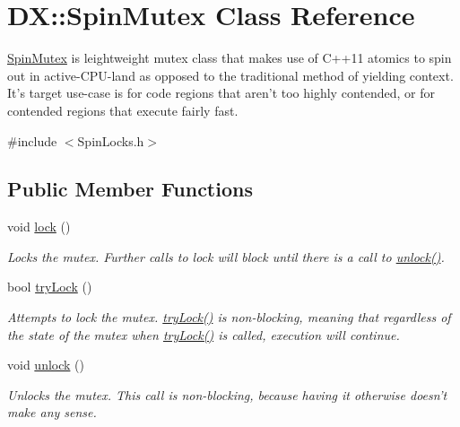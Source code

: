 \hypertarget{class_d_x_1_1_spin_mutex}{\section{D\-X\-:\-:Spin\-Mutex Class Reference}
\label{class_d_x_1_1_spin_mutex}
}


\hyperlink{class_d_x_1_1_spin_mutex}{Spin\-Mutex} is leightweight mutex class that makes use of C++11 atomics to spin out in active-\/\-C\-P\-U-\/land as opposed to the traditional method of yielding context. It's target use-\/case is for code regions that aren't too highly contended, or for contended regions that execute fairly fast.  




{\ttfamily \#include $<$Spin\-Locks.\-h$>$}

\subsection*{Public Member Functions}
\begin{DoxyCompactItemize}
\item 
void \hyperlink{class_d_x_1_1_spin_mutex_ad550ac8a2a96dbc0e53bb52c58c4a2e9}{lock} ()
\begin{DoxyCompactList}\small\item\em Locks the mutex. Further calls to lock will block until there is a call to \hyperlink{class_d_x_1_1_spin_mutex_a5c4d4863862540c18c007501d87168d6}{unlock()}. \end{DoxyCompactList}\item 
bool \hyperlink{class_d_x_1_1_spin_mutex_a5c1345257b4b39051d93d59460005cfc}{try\-Lock} ()
\begin{DoxyCompactList}\small\item\em Attempts to lock the mutex. \hyperlink{class_d_x_1_1_spin_mutex_a5c1345257b4b39051d93d59460005cfc}{try\-Lock()} is non-\/blocking, meaning that regardless of the state of the mutex when \hyperlink{class_d_x_1_1_spin_mutex_a5c1345257b4b39051d93d59460005cfc}{try\-Lock()} is called, execution will continue. \end{DoxyCompactList}\item 
\hypertarget{class_d_x_1_1_spin_mutex_a5c4d4863862540c18c007501d87168d6}{void \hyperlink{class_d_x_1_1_spin_mutex_a5c4d4863862540c18c007501d87168d6}{unlock} ()}\label{class_d_x_1_1_spin_mutex_a5c4d4863862540c18c007501d87168d6}

\begin{DoxyCompactList}\small\item\em Unlocks the mutex. This call is non-\/blocking, because having it otherwise doesn't make any sense. \end{DoxyCompactList}\end{DoxyCompactItemize}


